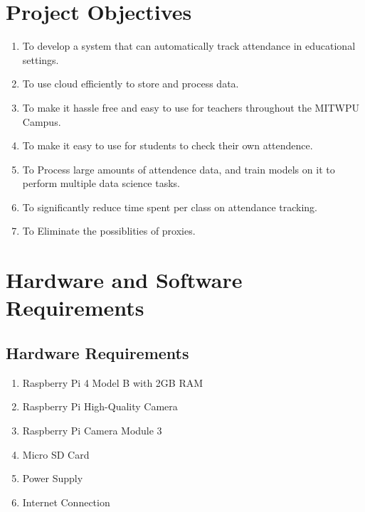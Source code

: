 \documentclass[11pt]{article}
\begin{document}
\section{Project Objectives}
\begin{enumerate}
    \item To develop a system that can automatically track attendance in educational settings.
    \item To use cloud efficiently to store and process data.
    \item To make it hassle free and easy to use for teachers throughout the MITWPU Campus.
    \item To make it easy to use for students to check their own attendence. 
    \item To Process large amounts of attendence data, and train models on it to perform multiple data science tasks.
    \item To significantly reduce time spent per class on attendance tracking.
    \item To Eliminate the possiblities of proxies.
\end{enumerate}

\section{Hardware and Software Requirements}

\subsection{Hardware Requirements}
\begin{enumerate}
    \item Raspberry Pi 4 Model B with 2GB RAM
    \item Raspberry Pi High-Quality Camera
    \item Raspberry Pi Camera Module 3
    \item Micro SD Card
    \item Power Supply
    \item Internet Connection
    
\end{enumerate}
\end{document}
